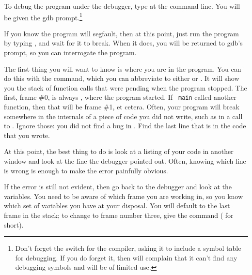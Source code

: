 \documentclass[12pt]{article}
\begin{document}
To debug the program  under the debugger, type  at the command line.  You will be given the gdb
prompt.\footnote{Don't forget the  switch for the
compiler, asking it to include a symbol table for debugging. If you
do forget it, then  will complain that it can't find any
debugging symbols and will be of limited use.}

If you know the program will segfault, then at this point, just run the program
by typing , and wait for it to break. When it does, you will be
returned to gdb's prompt, so you can interrogate the program.




The first thing you will want to know is where you are in the program. You
can do this with the  command, which you can abbreviate to
either  or . It will show you the stack of function
calls that were pending when the program stopped.  The first, frame
\#0, is always , where the program started. If {\tt
main} called another function, then that will be frame \#1, et cetera.
Often, your program will break somewhere in the internals of a piece of
code you did not write, such as in a call to . Ignore those:
you did not find a bug in . Find the last line that is in
the code that you wrote.

At this point, the best thing to do is look at a listing of your code
in another window and look at the line the debugger pointed out. Often,
knowing which line is wrong is enough to make the error painfully obvious.

If the error is still not evident, then go back to the debugger and look
at the variables. You need to be aware of which frame you are working in,
so you know which set of variables you have at your disposal.  You
will default to the last frame in the stack; to change to frame number
three, give the command  ( for short).
\end{document}
